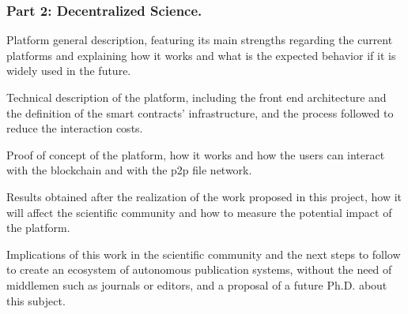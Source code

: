   \subsubsection*{Part 2: Decentralized Science.}
  \begin{itemize}
     Platform general description, featuring its
    main strengths regarding the current platforms and explaining how it works
    and what is the expected behavior if it is widely used in the future.

     Technical description of the platform, including the
    front end architecture and the definition of the smart contracts'
    infrastructure, and the process followed to reduce the interaction costs.

     Proof of concept of the platform, how it works and how the
    users can interact with the blockchain and with the p2p file network.

     Results obtained after the realization of the work
    proposed in this project, how it will affect the scientific community and
    how to measure the potential impact of the platform.

     Implications of this work in the
    scientific community and the next steps to follow to create an ecosystem of
    autonomous publication systems, without the need of middlemen such as
    journals or editors, and a proposal of a future Ph.D. about this subject.
  \end{itemize}


